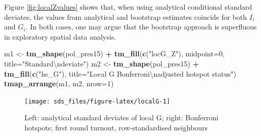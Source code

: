 \documentclass[]{book}
\newenvironment{Shaded}{\begin{snugshade}}{\end{snugshade}}
\newcommand{\CharTok}[1]{\textcolor[rgb]{0.31,0.60,0.02}{#1}}
\newcommand{\CommentTok}[1]{\textcolor[rgb]{0.56,0.35,0.01}{\textit{#1}}}
\newcommand{\DataTypeTok}[1]{\textcolor[rgb]{0.13,0.29,0.53}{#1}}
\newcommand{\DecValTok}[1]{\textcolor[rgb]{0.00,0.00,0.81}{#1}}
\newcommand{\KeywordTok}[1]{\textcolor[rgb]{0.13,0.29,0.53}{\textbf{#1}}}
\newcommand{\NormalTok}[1]{#1}
\newcommand{\OperatorTok}[1]{\textcolor[rgb]{0.81,0.36,0.00}{\textbf{#1}}}
\newcommand{\OtherTok}[1]{\textcolor[rgb]{0.56,0.35,0.01}{#1}}
\newcommand{\StringTok}[1]{\textcolor[rgb]{0.31,0.60,0.02}{#1}}
\begin{document}
Figure \ref{fig:localZvalues} shows that, when using analytical conditional standard deviates, the values from analytical and bootstrap estimates coincide for both \(I_i\) and \(G_i\). In both cases, one may argue that the bootstrap approach is superfluous in exploratory spatial data analysis.

\begin{Shaded}
\end{Shaded}



\begin{Shaded}
\begin{Highlighting}[]
\NormalTok{m1 <-}\StringTok{ }\KeywordTok{tm_shape}\NormalTok{(pol_pres15) }\OperatorTok{+}\StringTok{ }\KeywordTok{tm_fill}\NormalTok{(}\KeywordTok{c}\NormalTok{(}\StringTok{"locG_Z"}\NormalTok{), }\DataTypeTok{midpoint=}\DecValTok{0}\NormalTok{, }\DataTypeTok{title=}\StringTok{"Standard}\CharTok{\textbackslash{}n}\StringTok{deviate"}\NormalTok{)}
\NormalTok{m2 <-}\StringTok{ }\KeywordTok{tm_shape}\NormalTok{(pol_pres15) }\OperatorTok{+}\StringTok{ }\KeywordTok{tm_fill}\NormalTok{(}\KeywordTok{c}\NormalTok{(}\StringTok{"hs_G"}\NormalTok{), }
    \DataTypeTok{title=}\StringTok{"Local G Bonferroni}\CharTok{\textbackslash{}n}\StringTok{adjusted hotspot status"}\NormalTok{)}
\KeywordTok{tmap_arrange}\NormalTok{(m1, m2, }\DataTypeTok{nrow=}\DecValTok{1}\NormalTok{)}
\end{Highlighting}
\end{Shaded}

\begin{figure}

{\centering \texttt{[image: sds\_files/figure-latex/localG-1]} 

}

\caption{Left: analytical standard deviates of local G; right: Bonferroni hotspots; first round turnout, row-standardised neighbours}\label{fig:localG}
\end{figure}
\end{document}
